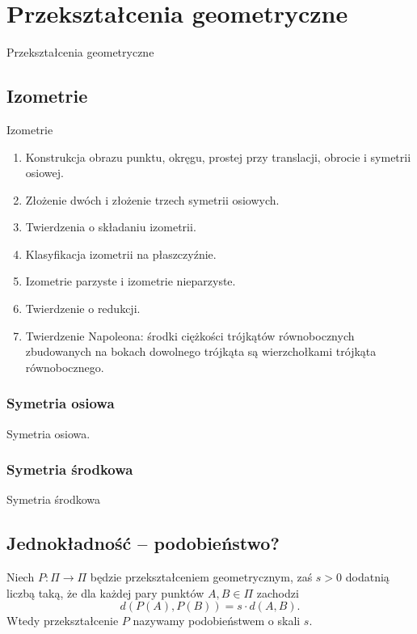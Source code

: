 \section{Przekształcenia geometryczne}
Przekształcenia geometryczne

\subsection{Izometrie}
Izometrie

\begin{enumerate}
    \item Konstrukcja obrazu punktu, okręgu, prostej przy translacji, obrocie i symetrii osiowej.
    \item Złożenie dwóch i złożenie trzech symetrii osiowych.
    \item Twierdzenia o składaniu izometrii.
    \item Klasyfikacja izometrii na płaszczyźnie.
    \item Izometrie parzyste i izometrie nieparzyste.
    \item Twierdzenie o redukcji.
    \item Twierdzenie Napoleona: środki ciężkości trójkątów równobocznych zbudowanych na bokach dowolnego trójkąta są wierzchołkami trójkąta równobocznego.
\end{enumerate}

\subsubsection{Symetria osiowa}
Symetria osiowa.

\subsubsection{Symetria środkowa}
Symetria środkowa

\subsection{Jednokładność -- podobieństwo?}

\begin{definition}[podobieństwo]
    Niech $P \colon \Pi \to \Pi$ będzie przekształceniem geometrycznym, zaś $s > 0$ dodatnią liczbą taką, że dla każdej pary punktów $A, B \in \Pi$ zachodzi
    \begin{equation}
        d(P(A), P(B)) = s \cdot d(A, B).
    \end{equation}
    Wtedy przekształcenie $P$ nazywamy podobieństwem o skali $s$.
\end{definition}

